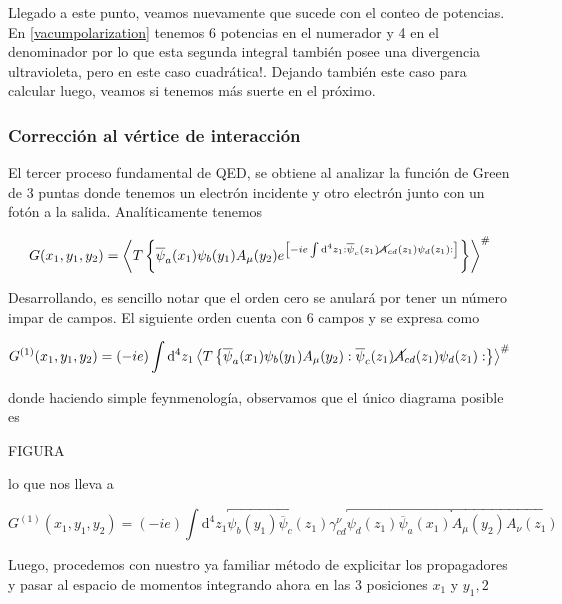 \documentclass{article}
\numberwithin{equation}{section}
\begin{document}
Llegado a este punto, veamos nuevamente que sucede con el conteo de potencias. En \ref{vacumpolarization} tenemos 6 potencias en el numerador y 4 en el denominador por lo que esta segunda integral también posee una divergencia ultravioleta, pero en este caso cuadrática!. Dejando también este caso para calcular luego, veamos si tenemos más suerte en el próximo.
\subsubsection{Corrección al vértice de interacción}

El tercer proceso fundamental de QED, se obtiene al analizar la función de Green de 3 puntas donde tenemos un electrón incidente y otro electrón junto con un fotón a la salida. Analíticamente tenemos

\begin{equation}\label{qedgreenvertex}
G(x_1,y_1,y_2)=\left\langle T\left\{ \overline{\psi}_a(x_1)\psi_b(y_1)A_{\mu}(y_2)e^{\left[-ie\int \mathrm{d^4}z_{1}:\overline{\psi}_c(z_{1})\cancel{A}_{cd}(z_{1})\psi_d(z_{1}):\right]}\right\} \right\rangle ^{\#}
\end{equation}

Desarrollando, es sencillo notar que el orden cero se anulará por tener un número impar de campos. El siguiente orden cuenta con 6 campos y se expresa como

\begin{equation}\label{key}
G^{(1)}(x_1,y_1,y_2)=(-ie)\int \mathrm{d^4}z_{1} \left\langle T\left\{ \overline{\psi}_a(x_1)\psi_b(y_1)A_{\mu}(y_2) :\overline{\psi}_c(z_{1})\cancel{A}_{cd}(z_{1})\psi_d(z_{1}):\right\} \right\rangle ^{\#}
\end{equation}

donde haciendo simple feynmenología, observamos que el único diagrama posible es

FIGURA

lo que nos lleva a

\begin{equation}\label{key}
G^{(1)}(x_1,y_1,y_2)=(-ie)\int \mathrm{d^4}z_{1} \overbracket{\psi_b(y_1)\overline{\psi}_c(z_{1})} \gamma^{\nu}_{cd} \overbracket{\psi_d(z_{1})\overline{\psi}_a(x_1)}  \overbracket{A_{\mu}(y_2) A_{\nu}(z_1)}
\end{equation}

Luego, procedemos con nuestro ya familiar método de explicitar los propagadores y pasar al espacio de momentos integrando ahora en las 3 posiciones $ x_1 $ y $ y_1,2 $
\end{document}
